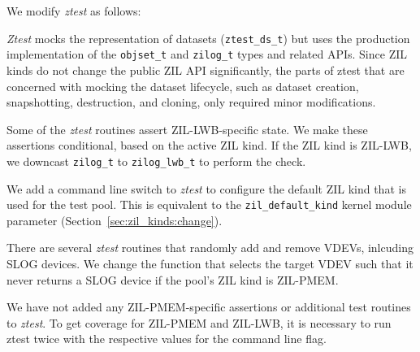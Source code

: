 \documentclass[12pt,a4paper,twoside]{book}
\begin{document}
We modify \textit{ztest} as follows:
\begin{description}[noitemsep]
    \item[Mocking]  \textit{Ztest} mocks the representation of datasets (\lstinline{ztest_ds_t}) but uses the production implementation of the \lstinline{objset_t} and \lstinline{zilog_t} types and related APIs.
        Since ZIL kinds do not change the public ZIL API significantly, the parts of ztest that are concerned with mocking the dataset lifecycle, such as dataset creation, snapshotting, destruction, and cloning, only required minor modifications.
    \item[ZIL-LWB-Specific Assertions] Some of the \textit{ztest} routines assert ZIL-LWB-specific state.
        We make these assertions conditional, based on the active ZIL kind.
        If the ZIL kind is ZIL-LWB, we downcast \lstinline{zilog_t} to \lstinline{zilog_lwb_t} to perform the check.
    \item[Configurable ZIL Kinds] We add a command line switch to \textit{ztest} to configure the default ZIL kind that is used for the test pool.
        This is equivalent to the \lstinline{zil_default_kind} kernel module parameter (Section~\ref{sec:zil_kinds:change}).
    \item[VDEV Management] There are several \textit{ztest} routines that randomly add and remove VDEVs, inlcuding SLOG devices.
        We change the function that selects the target VDEV such that it never returns a SLOG device if the pool's ZIL kind is ZIL-PMEM.
\end{description}
We have not added any ZIL-PMEM-specific assertions or additional test routines to \textit{ztest}.
To get coverage for ZIL-PMEM and ZIL-LWB, it is necessary to run ztest twice with the respective values for the command line flag.
\end{document}
